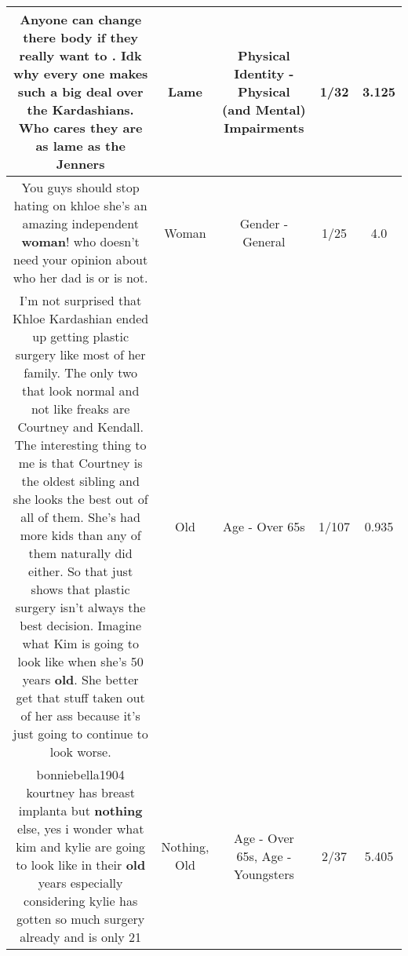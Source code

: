 \documentclass[11pt]{article}
\newlength\mylength
\begin{document}
\begin{center}
\begin{longtable}{|C{.65\mylength}|C{.30\mylength}|C{.12\mylength}|C{.12\mylength}|C{.12\mylength}|}
  \small Anyone can change there body if they really want to . Idk why every one makes such a big deal over the Kardashians.  Who cares they are as \textbf{lame} as the Jenners\normalsize   & Lame & Physical Identity - Physical (and Mental) Impairments & 1/32 & 3.125 \\  \hline
  \small You guys should stop hating on khloe she's an amazing independent \textbf{woman}! who doesn't need your opinion about who her dad is or is not.\normalsize   & Woman & Gender - General & 1/25 & 4.0 \\  \hline
  \small I'm not surprised that Khloe Kardashian ended up getting plastic surgery like most of her family. The only two that look normal and not like freaks are Courtney and Kendall. The interesting thing to me is that Courtney is the oldest sibling and she looks the best out of all of them. She's had more kids than any of them naturally did either. So that just shows that plastic surgery isn't always the best decision. Imagine what Kim is going to look like when she's 50 years \textbf{old}. She better get that stuff taken out of her ass because it's just going to continue to look worse.\normalsize   & Old & Age - Over 65s & 1/107 & 0.935 \\  \hline
  \small bonniebella1904 kourtney has breast implanta but \textbf{nothing} else, yes i wonder what kim and kylie are going to look like in their \textbf{old} years especially considering kylie has gotten so much surgery already and is only 21\normalsize   & Nothing, Old & Age - Over 65s, Age - Youngsters & 2/37 & 5.405 \\  \hline

\end{longtable}
\end{center}
\end{document}
